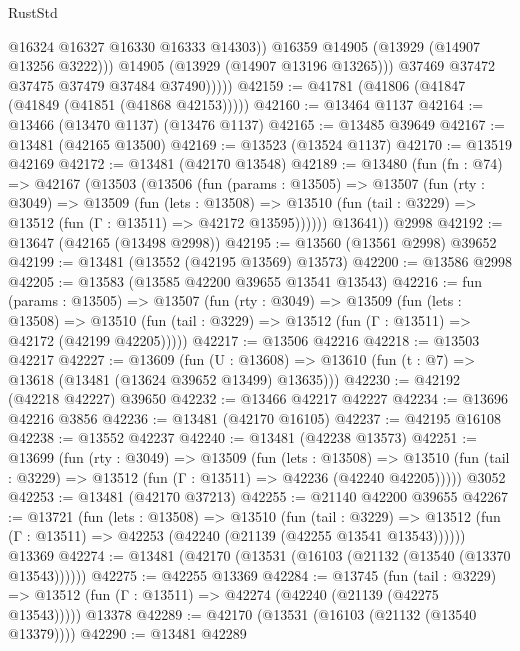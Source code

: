 \begin{lexlean}{RustStd}
\begin{coremodule}
                      @16324
                      @16327
                      @16330
                      @16333
                      @14303))
                  @16359
                  @14905
                  (@13929 (@14907 @13256 @3222)))
                @14905
                (@13929 (@14907 @13196 @13265)))
              @37469
              @37472
              @37475
              @37479
              @37484
              @37490)))))
@42159 := @41781 (@41806 (@41847 (@41849 (@41851 (@41868 @42153)))))
@42160 := @13464 @1137
@42164 := @13466 (@13470 @1137) (@13476 @1137)
@42165 := @13485 @39649
@42167 := @13481 (@42165 @13500)
@42169 := @13523 (@13524 @1137)
@42170 := @13519 @42169
@42172 := @13481 (@42170 @13548)
@42189 := @13480
    (fun (fn : @74) =>
    @42167
      (@13503
        (@13506
          (fun (params : @13505) =>
          @13507
            (fun (rty : @3049) =>
            @13509
              (fun (lets : @13508) =>
              @13510 (fun (tail : @3229) => @13512 (fun (Γ : @13511) => @42172 @13595))))))
        @13641))
    @2998
@42192 := @13647 (@42165 (@13498 @2998))
@42195 := @13560 (@13561 @2998) @39652
@42199 := @13481 (@13552 (@42195 @13569) @13573)
@42200 := @13586 @2998
@42205 := @13583 (@13585 @42200 @39655 @13541 @13543)
@42216 := fun (params : @13505) =>
  @13507
    (fun (rty : @3049) =>
    @13509
      (fun (lets : @13508) =>
      @13510 (fun (tail : @3229) => @13512 (fun (Γ : @13511) => @42172 (@42199 @42205)))))
@42217 := @13506 @42216
@42218 := @13503 @42217
@42227 := @13609
    (fun (U : @13608) => @13610 (fun (t : @7) => @13618 (@13481 (@13624 @39652 @13499) @13635)))
@42230 := @42192 (@42218 @42227) @39650
@42232 := @13466 @42217 @42227
@42234 := @13696 @42216 @3856
@42236 := @13481 (@42170 @16105)
@42237 := @42195 @16108
@42238 := @13552 @42237
@42240 := @13481 (@42238 @13573)
@42251 := @13699
    (fun (rty : @3049) =>
    @13509
      (fun (lets : @13508) =>
      @13510 (fun (tail : @3229) => @13512 (fun (Γ : @13511) => @42236 (@42240 @42205)))))
    @3052
@42253 := @13481 (@42170 @37213)
@42255 := @21140 @42200 @39655
@42267 := @13721
    (fun (lets : @13508) =>
    @13510
      (fun (tail : @3229) =>
      @13512 (fun (Γ : @13511) => @42253 (@42240 (@21139 (@42255 @13541 @13543))))))
    @13369
@42274 := @13481 (@42170 (@13531 (@16103 (@21132 (@13540 (@13370 @13543))))))
@42275 := @42255 @13369
@42284 := @13745
    (fun (tail : @3229) => @13512 (fun (Γ : @13511) => @42274 (@42240 (@21139 (@42275 @13543)))))
    @13378
@42289 := @42170 (@13531 (@16103 (@21132 (@13540 @13379))))
@42290 := @13481 @42289

\end{coremodule}
\end{lexlean}
